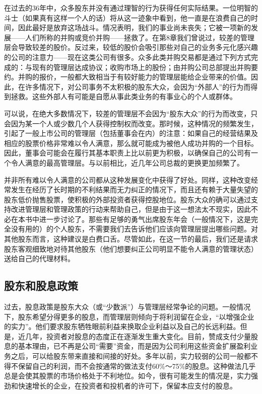 \documentclass[12pt,oneside]{book}
\begin{document}
在过去的36年中，众多股东并没有通过理智的行为获得任何实际结果。一位明智的斗士（如果真有这样一个人的话）将从这一迹象中看到，他一直是在浪费自己的时间，因此最好是放弃这场战斗。情况表明，我们的事业尚未丧失；它被一项新的发展——人们所称的并购或竞价并购——拯救了。在第8章我们曾说过，较差的管理层会导致较差的股价。反过来，较低的股价会吸引那些对自己的业务多元化感兴趣的公司的注意力——现在这类公司有很多。众多此类并购交易都是通过下列方式完成的：与现有的管理层达成协议；收购市场上的股份；由并购公司总部提出并购要约。并购的报价，一般都大致相当于有较好能力的管理层能给企业带来的价值。因此，在许多情况下，对公司事务不太积极的股东大众，会因为“外部人”的行为而得到拯救。这些外部人有可能是自愿从事此类业务的有事业心的个人或群体。

可以说，在绝大多数情况下，较差的管理层不会因为“股东大众”的行为而改变，只会因为某一个人或少数几个人获得控制权而改变。那时候，这种情况的频繁发生，引起了一般上市公司的管理层（包括董事会在内）的注意：如果自己的经营结果及相应的股票价格非常难以令人满意，那么就可能成为被他人成功并购的一个目标。因此，董事会可能会在履行其基本职责上比以前更为积极，以确保自己的公司有一个令人满意的最高管理层。与以前相比，近几年公司总裁的更换更加频繁了。

并非所有难以令人满意的公司都从这种发展变化中获得了好处。同样，这种改变经常发生在经历了长时期的不利结果而无力纠正的情况下，而且还有赖于大量失望的股东低价抛售股票，使积极的外部投资者获得控股地位。股东大众的确可以通过支持改进管理层和管理政策的行动来帮助自己，但是由于这一想法太不现实，因此不必在本书中进一步讨论了。那些有足够的勇气出席股东年会（一般情况下，这是完全没有用的）的个人股东，不需要我们去告诉他们应该向管理层提出哪些问题。对其他股东而言，这种建议是白费口舌。尽管如此，在这一节的最后，我们还是请求股东客观细致地对待其他股东（他们想要纠正公司明显不能令人满意的管理状态）送给自己的代理材料。

\subsection{股东和股息政策}
过去，股息政策是股东大众（或“少数派”）与管理层经常争论的问题。一般情况下，股东希望分得更多的股息，而管理层则倾向于将利润留在企业，“以增强企业的实力”。他们要求股东牺牲眼前利益来换取企业利益以及自己的长远利益。但是，近几年，投资者对股息的态度正在逐渐发生重大变化。目前，赞成支付少量股息的基本理由，已不再是公司“需要”资金，而是因为公司利用这些资金扩展盈利业务之后，可以给股东带来直接和间接的好处。多年以前，实力较弱的公司一般都不得不保留自己的利润，而不会按通常的做法支付60\%～75\%的股息。这种做法几乎总是会使其股票的市场价格处于不利地位。如今，很有可能发生的情况是，实力强劲和快速增长的企业，在投资者和投机者的许可下，保留本应支付的股息。
\end{document}
